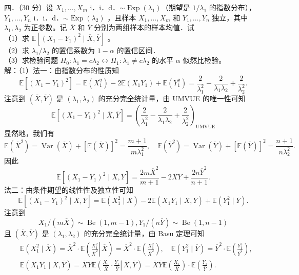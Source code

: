 \documentclass[UTF8]{ctexart}
\begin{document}
\noindent 四．（30 分）设 $X_1, \ldots, X_m$ i．i．d．$\sim \operatorname{Exp}\left(\lambda_1\right)$（期望是 $1 / \lambda_1$ 的指数分布），$Y_1, \ldots, Y_n$ i．i．d．$\sim \operatorname{Exp}\left(\lambda_2\right)$ ，且样本 $X_1, \ldots, X_m$ 和 $Y_1, \ldots, Y_n$ 独立，其中 $\lambda_1, \lambda_2$ 为正参数。记 $\overline{X}$ 和 $\overline{Y}$ 分别为两组样本的样本均值．试\\
（1）求 $\mathbb{E}\left[\left(X_1-Y_1\right)^2 \mid \overline{X}, \overline{Y}\right]$ 。\\
（2）求 $\lambda_1 / \lambda_2$ 的置信系数为 $1-\alpha$ 的置信区间．\\
（3）求检验问题 $H_0: \lambda_1=c \lambda_2 \leftrightarrow H_1: \lambda_1 \neq c \lambda_2$ 的水平 $\alpha$ 似然比检验。\\
解：（1）法一：由指数分布的性质知
$$
\mathbb{E}\left[\left(X_1-Y_1\right)^2\right]=\mathbb{E}\left(X_1^2\right)-2 \mathbb{E}\left(X_1 Y_1\right)+\mathbb{E}\left(Y_1^2\right)=\frac{2}{\lambda_1^2}-\frac{2}{\lambda_1 \lambda_2}+\frac{2}{\lambda_2^2} .
$$
注意到 $(\overline{X}, \overline{Y})$ 是 $\left(\lambda_1, \lambda_2\right)$ 的充分完全统计量，由 UMVUE 的唯一性可知
$$
\mathbb{E}\left[\left(X_1-Y_1\right)^2 \mid \overline{X}, \overline{Y}\right]=\left(\frac{2}{\lambda_1^2}-\frac{2}{\lambda_1 \lambda_2}+\frac{2}{\lambda_2^2}\right)_{\mathrm{UMVUE}}
$$
显然地，我们有
$$
\mathbb{E}\left(\overline{X}^2\right)=\operatorname{Var}(\overline{X})+[\mathbb{E}(\overline{X})]^2=\frac{m+1}{m \lambda_1^2}, \quad \mathbb{E}\left(\overline{Y}^2\right)=\operatorname{Var}(\overline{Y})+[\mathbb{E}(\overline{Y})]^2=\frac{n+1}{n \lambda_2^2} .
$$
因此
$$
\mathbb{E}\left[\left(X_1-Y_1\right)^2 \mid \overline{X}, \overline{Y}\right]=\frac{2 m \overline{X}^2}{m+1}-2 \overline{X} \overline{Y}+\frac{2 n \overline{Y}^2}{n+1} .
$$
法二：由条件期望的线性性及独立性可知
$$
\mathbb{E}\left[\left(X_1-Y_1\right)^2 \mid \overline{X}, \overline{Y}\right]=\mathbb{E}\left(X_1^2 \mid \overline{X}\right)-2 \mathbb{E}\left(X_1 Y_1 \mid \overline{X}, \overline{Y}\right)+\mathbb{E}\left(Y_1^2 \mid \overline{Y}\right) .
$$
注意到 
$$X_1 /(m \overline{X}) \sim \operatorname{Be}(1, m-1), Y_1 /(n \overline{Y}) \sim \operatorname{Be}(1, n-1)$$
且 $(\overline{X}, \overline{Y})$ 是 $\left(\lambda_1, \lambda_2\right)$ 的充分完全统计量，由 Basu 定理可知
$$
\begin{aligned}
	& \mathbb{E}\left(X_1^2 \mid \overline{X}\right)=\overline{X}^2 \cdot \mathbb{E}\left(\left.\frac{X_1^2}{\overline{X}^2} \right\rvert\, \overline{X}\right)=\overline{X}^2 \cdot \mathbb{E}\left(\frac{X_1^2}{\overline{X}^2}\right), \quad \mathbb{E}\left(Y_1^2 \mid \overline{Y}\right)=\overline{Y}^2 \cdot \mathbb{E}\left(\frac{Y_1^2}{\overline{Y}^2}\right), \\
	& \mathbb{E}\left(X_1 Y_1 \mid \overline{X}, \overline{Y}\right)=\overline{X} \overline{Y} \mathbb{E}\left(\left.\frac{X_1}{\overline{X}} \cdot \frac{Y_1}{\overline{Y}} \right\rvert\, \overline{X}, \overline{Y}\right)=\overline{X} \overline{Y} \mathbb{E}\left(\frac{X_1}{\overline{X}}\right) \cdot \mathbb{E}\left(\frac{Y_1}{\overline{Y}}\right) .
\end{aligned}
$$
\end{document}
